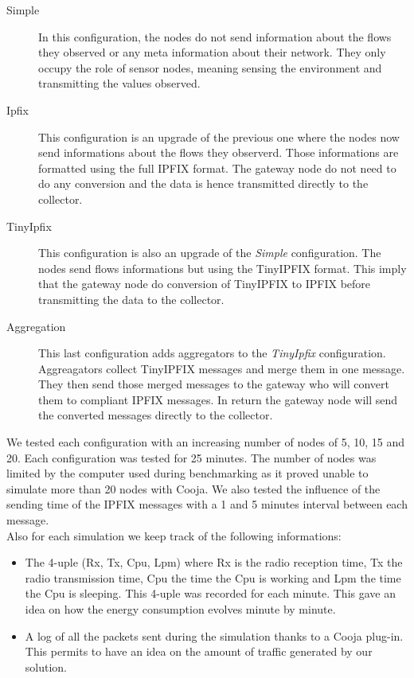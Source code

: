 \begin{description}
  \item[Simple] In this configuration, the nodes do not send information about the flows they observed or any meta information about their network. They only occupy the role of sensor nodes, meaning sensing the environment and transmitting the values observed.
  \item[Ipfix] This configuration is an upgrade of the previous one where the nodes now send informations about the flows they observerd. Those informations are formatted using the full IPFIX format. The gateway node do not need to do any conversion and the data is hence transmitted directly to the collector.
  \item[TinyIpfix] This configuration is also an upgrade of the \textit{Simple} configuration. The nodes send flows informations but using the TinyIPFIX format. This imply that the gateway node do conversion of TinyIPFIX to IPFIX before transmitting the data to the collector.
  \item[Aggregation] This last configuration adds aggregators to the \textit{TinyIpfix} configuration. Aggreagators collect TinyIPFIX messages and merge them in one message. They then send those merged messages to the gateway who will convert them to compliant IPFIX messages. In return the gateway node will send the converted messages directly to the collector. \\
\end{description}

We tested each configuration with an increasing number of nodes of 5, 10, 15 and 20. Each configuration was tested for 25 minutes. The number of nodes was limited by the computer used during benchmarking as it proved unable to simulate more than 20 nodes with Cooja. We also tested the influence of the sending time of the IPFIX messages with a 1 and 5 minutes interval between each message.\\

Also for each simulation we keep track of the following informations:
\begin{itemize}
  \item The 4-uple (Rx, Tx, Cpu, Lpm) where Rx is the radio reception time, Tx the radio transmission time, Cpu the time the Cpu is working and Lpm the time the Cpu is sleeping. This 4-uple was recorded for each minute. This gave an idea on how the energy consumption evolves minute by minute.
  \item A log of all the packets sent during the simulation thanks to a Cooja plug-in. This permits to have an idea on the amount of traffic generated by our solution.\\
\end{itemize}

